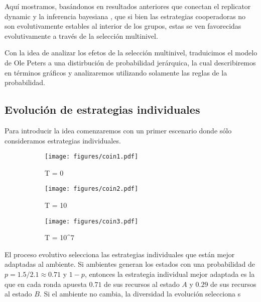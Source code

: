 \documentclass[a4paper,10pt]{article}
\begin{document}
Aquí mostramos, basándonos en resultados anteriores que conectan el replicator dynamic y la inferencia bayesiana \cite{}, que si bien las estrategias cooperadoras no son evolutivamente estables al interior de los grupos, estas se ven favorecidas evolutivamente a través de la selección multinivel.

Con la idea de analizar los efetos de la selección multinivel, traduicimos el modelo de Ole Peters a una distirbución de probabilidad jerárquica, la cual describiremos en términos gráficos y analizaremos utilizando solamente las reglas de la probabilidad.

\subsection{Evolución de estrategias individuales}

Para introducir la idea comenzaremos con un primer escenario donde sólo consideramos estrategias individuales.

\begin{figure}[H]
\centering
{}
\caption{}
\label{fig:modelo_beta_binomial}
\end{figure}

\begin{figure}[H]
    \centering
    \begin{subfigure}[b]{0.32\textwidth}
    \texttt{[image: figures/coin1.pdf]}
    \caption{T = 0}
    \end{subfigure}
    \begin{subfigure}[b]{0.32\textwidth}
    \texttt{[image: figures/coin2.pdf]}
    \caption{T = 10}
    \end{subfigure}
    \begin{subfigure}[b]{0.32\textwidth}
    \texttt{[image: figures/coin3.pdf]}
    \caption{T = 10^7}
    \end{subfigure}
    \caption{}
    \label{fig:estrategias_individuales}
\end{figure}

El proceso evolutivo selecciona las estrategias individuales que están mejor adaptadas al ambiente.
Si ambientes generan los estados con una probabilidad de $p=1.5/2.1\approx 0.71$ y $1-p$, entonces la estrategia individual mejor adaptada es la que en cada ronda apuesta $0.71$ de sus recursos al estado $A$ y $0.29$ de sus recursos al estado $B$.
Si el ambiente no cambia, la diversidad la evolución selecciona s
\end{document}
